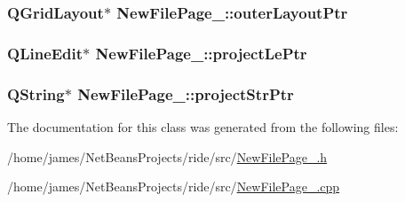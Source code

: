 \hypertarget{class_new_file_page__4_a4b4a6d04dd80df11c8acaf2939a5000e}{
\subsubsection[{outer\-Layout\-Ptr}]{\setlength{\rightskip}{0pt plus 5cm}Q\-Grid\-Layout$\ast$ New\-File\-Page\-\_\-::outer\-Layout\-Ptr\hspace{0.3cm}{\ttfamily [private]}}}\label{class_new_file_page__4_a4b4a6d04dd80df11c8acaf2939a5000e}
\hypertarget{class_new_file_page__4_a1373433031aa8284d1e4b597b2b3ef5f}{
\subsubsection[{project\-Le\-Ptr}]{\setlength{\rightskip}{0pt plus 5cm}Q\-Line\-Edit$\ast$ New\-File\-Page\-\_\-::project\-Le\-Ptr\hspace{0.3cm}{\ttfamily [private]}}}\label{class_new_file_page__4_a1373433031aa8284d1e4b597b2b3ef5f}
\hypertarget{class_new_file_page__4_ab1f30508de73c5748ed96c7acd2c0821}{
\subsubsection[{project\-Str\-Ptr}]{\setlength{\rightskip}{0pt plus 5cm}Q\-String$\ast$ New\-File\-Page\-\_\-::project\-Str\-Ptr\hspace{0.3cm}{\ttfamily [private]}}}\label{class_new_file_page__4_ab1f30508de73c5748ed96c7acd2c0821}


The documentation for this class was generated from the following files\-:\begin{DoxyCompactItemize}
\item 
/home/james/\-Net\-Beans\-Projects/ride/src/\hyperlink{_new_file_page__4_8h}{New\-File\-Page\-\_.\-h}\item 
/home/james/\-Net\-Beans\-Projects/ride/src/\hyperlink{_new_file_page__4_8cpp}{New\-File\-Page\-\_.\-cpp}\end{DoxyCompactItemize}
